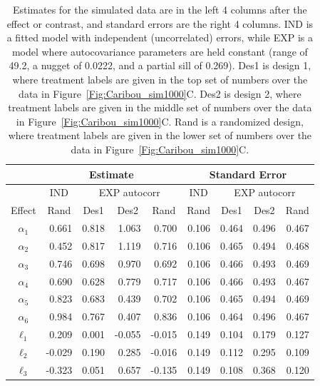 \documentclass[12pt, titlepage]{article}
\begin{document}
\begin{table}[H] 
	\caption{Estimates for the simulated data are in the left 4 columns after the effect or contrast, and standard errors are the right 4 columns.  IND is a fitted model with independent (uncorrelated) errors, while EXP is a model where autocovariance parameters are held constant (range of 49.2, a nugget of 0.0222, and a partial sill of 0.269). Des1 is design 1, where treatment labels are given in the top set of numbers over the data in Figure~\ref{Fig:Caribou_sim1000}C.  Des2 is design 2, where treatment labels are given in the middle set of numbers over the data in Figure~\ref{Fig:Caribou_sim1000}C.  Rand is a randomized design, where treatment labels are given in the lower set of numbers over the data in Figure~\ref{Fig:Caribou_sim1000}C. \label{tab:sim_estse}}
\begin{center}
\begin{tabular}{|c|r|rrr|r|rrr|}
  \hline
  \hline{}
   & \multicolumn{4}{|c|}{Estimate} & \multicolumn{4}{c|}{Standard Error} \\
  \hline
   & \multicolumn{1}{|c|}{IND} & \multicolumn{3}{c|}{EXP autocorr} & \multicolumn{1}{|c|}{IND} & \multicolumn{3}{c|}{EXP autocorr}\\
Effect & \multicolumn{1}{|c|}{Rand} & \multicolumn{1}{c}{Des1} & \multicolumn{1}{c}{Des2} & \multicolumn{1}{c|}{Rand} & \multicolumn{1}{|c|}{Rand} & \multicolumn{1}{c}{Des1} & \multicolumn{1}{c}{Des2} & \multicolumn{1}{c|}{Rand} \\
  \hline
  \hline{}
$\alpha_{1}$ & 0.661 & 0.818 & 1.063 & 0.700 & 0.106 & 0.464 & 0.496 & 0.467 \\ 
$\alpha_{2}$ &  0.452 & 0.817 & 1.119 & 0.716 & 0.106 & 0.465 & 0.494 & 0.468 \\ 
$\alpha_{3}$ &  0.746 & 0.698 & 0.970 & 0.692 & 0.106 & 0.466 & 0.493 & 0.469 \\ 
$\alpha_{4}$ &  0.690 & 0.628 & 0.779 & 0.717 & 0.106 & 0.466 & 0.493 & 0.467 \\ 
$\alpha_{5}$ &  0.823 & 0.683 & 0.439 & 0.702 & 0.106 & 0.465 & 0.494 & 0.469 \\ 
$\alpha_{6}$ &  0.984 & 0.767 & 0.407 & 0.836 & 0.106 & 0.464 & 0.496 & 0.467 \\ 
  \hline
$\ell_{1}$ & 0.209 & 0.001 & -0.055 & -0.015 & 0.149 & 0.104 & 0.179 & 0.127 \\ 
$\ell_{2}$ & -0.029 & 0.190 & 0.285 & -0.016 & 0.149 & 0.112 & 0.295 & 0.109 \\ 
$\ell_{3}$ & -0.323 & 0.051 & 0.657 & -0.135 & 0.149 & 0.108 & 0.368 & 0.120 \\ 
  \hline
  \hline
\end{tabular}
\end{center}
\end{table}
\end{document}
